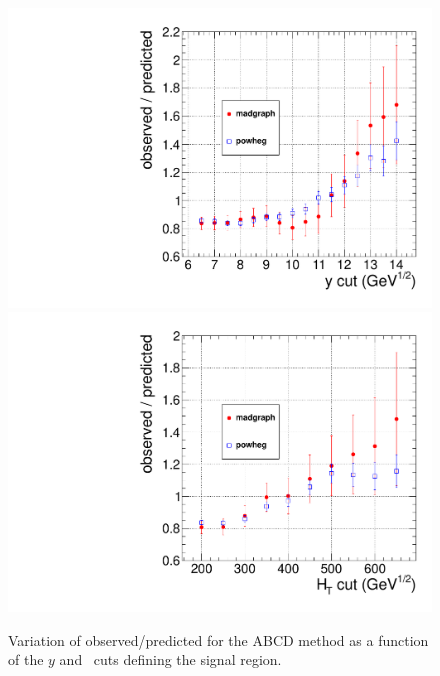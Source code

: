 \begin{figure}[hbt]
\begin{center}
\includegraphics[width=0.48\linewidth]{plots/abcd_y.pdf}
\includegraphics[width=0.48\linewidth]{plots/abcd_ht.pdf}
\caption{\label{fig:victory}\protect Variation of observed/predicted
for the ABCD method as a function of the $y$ and \Ht\ cuts defining
the signal region.}
\end{center}
\end{figure}


